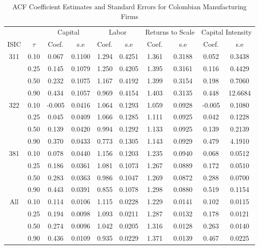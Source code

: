 \begin{table}[ht]
\centering
\caption{ACF Coefficient Estimates and Standard Errors for Colombian Manufacturing Firms} 
\begin{tabular}{cccccccccc}
  \hline\hline & & \multicolumn{2}{c}{Capital}  & \multicolumn{2}{c}{Labor} & \multicolumn{2}{c}{Returns to Scale} & \multicolumn{2}{c}{Capital Intensity}\\ \cmidrule(lr){3-4} \cmidrule(lr){5-6} \cmidrule(lr){7-8} \cmidrule(lr){9-10}ISIC & $\tau$ & Coef. & s.e & Coef. & s.e & Coef. & s.e & Coef. & s.e \\ 
  \hline
311 & 0.10 & 0.067 & 0.1100 & 1.294 & 0.4251 & 1.361 & 0.3188 & 0.052 & 0.3438 \\ 
   & 0.25 & 0.145 & 0.1079 & 1.250 & 0.4205 & 1.395 & 0.3161 & 0.116 & 0.4429 \\ 
   & 0.50 & 0.232 & 0.1075 & 1.167 & 0.4192 & 1.399 & 0.3154 & 0.198 & 0.7060 \\ 
   & 0.90 & 0.434 & 0.1057 & 0.969 & 0.4154 & 1.403 & 0.3135 & 0.448 & 12.6684 \\ 
  322 & 0.10 & -0.005 & 0.0416 & 1.064 & 0.1293 & 1.059 & 0.0928 & -0.005 & 0.1080 \\ 
   & 0.25 & 0.045 & 0.0409 & 1.066 & 0.1285 & 1.111 & 0.0925 & 0.042 & 0.1228 \\ 
   & 0.50 & 0.139 & 0.0420 & 0.994 & 0.1292 & 1.133 & 0.0925 & 0.139 & 0.2139 \\ 
   & 0.90 & 0.370 & 0.0433 & 0.773 & 0.1305 & 1.143 & 0.0929 & 0.479 & 4.1910 \\ 
  381 & 0.10 & 0.078 & 0.0440 & 1.156 & 0.1203 & 1.235 & 0.0940 & 0.068 & 0.0512 \\ 
   & 0.25 & 0.186 & 0.0361 & 1.081 & 0.1073 & 1.267 & 0.0889 & 0.172 & 0.0510 \\ 
   & 0.50 & 0.283 & 0.0363 & 0.986 & 0.1047 & 1.269 & 0.0872 & 0.288 & 0.0700 \\ 
   & 0.90 & 0.443 & 0.0391 & 0.855 & 0.1078 & 1.298 & 0.0880 & 0.519 & 0.1154 \\ 
  All & 0.10 & 0.114 & 0.0106 & 1.115 & 0.0228 & 1.229 & 0.0141 & 0.102 & 0.0115 \\ 
   & 0.25 & 0.194 & 0.0098 & 1.093 & 0.0211 & 1.287 & 0.0132 & 0.178 & 0.0121 \\ 
   & 0.50 & 0.274 & 0.0096 & 1.042 & 0.0205 & 1.316 & 0.0128 & 0.263 & 0.0140 \\ 
   & 0.90 & 0.436 & 0.0109 & 0.935 & 0.0229 & 1.371 & 0.0139 & 0.467 & 0.0225 \\ 
   \hline
\end{tabular}
\end{table}
